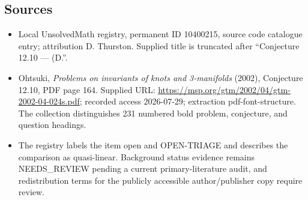 \documentclass[11pt]{article}
\begin{document}
\subsection{Sources}
\begin{itemize}
\item Local UnsolvedMath registry, permanent ID 10400215, source code catalogue entry; attribution D. Thurston. Supplied title is truncated after ``Conjecture 12.10 --- (D.''.
\item Ohtsuki, \emph{Problems on invariants of knots and 3-manifolds} (2002), Conjecture 12.10, PDF page 164. Supplied URL: \url{https://msp.org/gtm/2002/04/gtm-2002-04-024s.pdf}; recorded access 2026-07-29; extraction pdf-font-structure. The collection distinguishes 231 numbered bold problem, conjecture, and question headings.
\item The registry labels the item open and OPEN-TRIAGE and describes the comparison as quasi-linear. Background status evidence remains NEEDS\_REVIEW pending a current primary-literature audit, and redistribution terms for the publicly accessible author/publisher copy require review.
\end{itemize}
\end{document}
